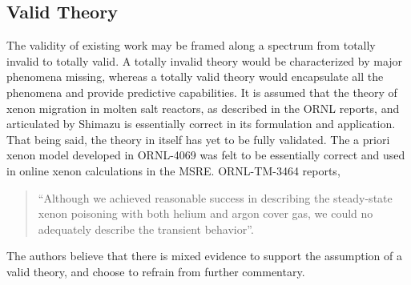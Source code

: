 \subsection{Valid Theory}
The validity of existing work may be framed along a spectrum from totally invalid to totally valid. A totally invalid theory would be characterized by major phenomena missing, whereas a totally valid theory would encapsulate all the phenomena and provide predictive capabilities. It is assumed that the theory of xenon migration in molten salt reactors, as described in the ORNL reports, and articulated by Shimazu is essentially correct in its formulation and application.  That being said, the theory in itself has yet to be fully validated.  The a priori xenon model developed in ORNL-4069 was felt to be essentially correct and used in online xenon calculations in the MSRE.\cite[p. 16] {ORNLTM3464} ORNL-TM-3464 reports,
\begin{quote}
    “Although we achieved reasonable success in describing the steady-state xenon poisoning with both helium and argon cover gas, we could no adequately describe the transient behavior”. \cite[p. 91]{ORNLTM3464}
\end{quote}
The authors believe that there is mixed evidence to support the assumption of a valid theory, and choose to refrain from further commentary. 